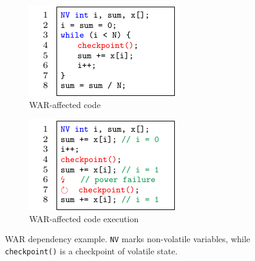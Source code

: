 \begin{figure}
    \begin{subfigure}{0.49\columnwidth}
        \includegraphics[width=\columnwidth]{figures/war-example.pdf}
        \caption{WAR-affected code}
        \label{fig:war-example}
    \end{subfigure}
    \begin{subfigure}{0.49\columnwidth}
        \includegraphics[width=\columnwidth]{figures/war-execution.pdf}
        \caption{WAR-affected code execution}
        \label{fig:war-execution}
    \end{subfigure}
    \caption{WAR dependency example. \texttt{NV} marks non-volatile variables, while \texttt{checkpoint()} is a checkpoint of volatile state.}
    \label{fig:war}
\end{figure}

